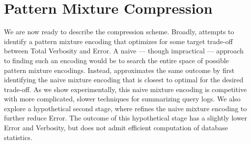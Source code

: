 \section{Pattern Mixture Compression}
\label{sec:constructingencodings}
We are now ready to describe the \systemname compression scheme.
Broadly, \systemname attempts to identify a pattern mixture encoding that optimizes for some target trade-off between Total Verbosity and Error.  
A naive --- though impractical --- approach to finding such an encoding would be to search the entire space of possible pattern mixture encodings.
Instead, \systemname approximates the same outcome by first identifying the naive mixture encoding that is closest to optimal for the desired trade-off.
As we show experimentally, this naive mixture encoding is competitive with more complicated, slower techniques for summarizing query logs.
We also explore a hypothetical second stage, where \systemname refines the naive mixture encoding to further reduce Error.
The outcome of this hypothetical stage has a slightly lower Error and Verbosity, but does not admit efficient computation of database statistics. 

